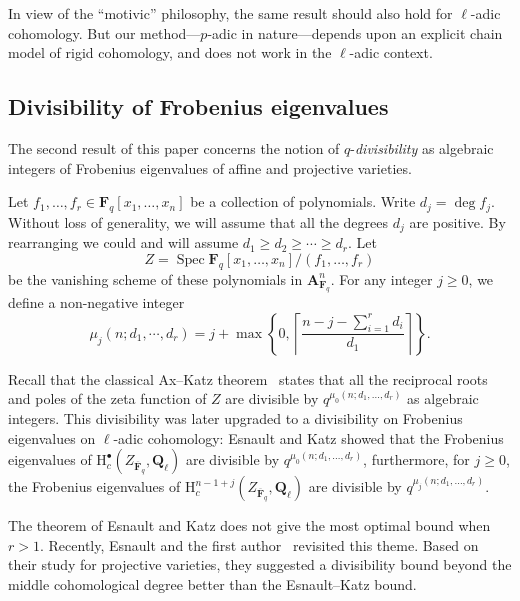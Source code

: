 \documentclass{amsart}
\numberwithin{equation}{section}
\theoremstyle{plain}
\theoremstyle{definition}
\renewcommand{\mathbb}{\mathbf}
\begin{document}
In view of the ``motivic'' philosophy, the same result should
also hold for \(\ell\)-adic cohomology. But our method---\(p\)-adic in
nature---depends upon an explicit chain model of rigid cohomology, and
does not work in the \(\ell\)-adic context.


\subsection{Divisibility of Frobenius eigenvalues}
The second result of this paper concerns the notion of
$q$-\emph{divisibility} as algebraic integers of Frobenius eigenvalues
of affine and projective varieties.

Let \(f_1,\ldots,f_r \in \mathbb{F}_{q}[x_1,\ldots,x_n]\) be a collection of
polynomials. Write \(d_j = \deg f_j\). Without loss of generality, we will assume that all the degrees $d_j$ are
positive. By rearranging we could and will assume
\(d_1\geq d_2\geq \cdots \geq d_r\).
Let \[Z = \operatorname{Spec}\mathbb{F}_q[x_1,\ldots,x_n]/(f_1,\ldots,f_r)\]
be the vanishing scheme of these polynomials in \(\mathbb{A}^{n}_{\mathbb{F}_q}\). For any integer $j\geq 0$,
we define a  non-negative integer
\begin{equation*}
  \mu_j(n;d_1,\cdots, d_r) = j + \max\left\{0, \left\lceil \frac{n-j-\sum_{i=1}^{r}d_i}{d_1}\right\rceil\right\}.
\end{equation*}

Recall that the classical Ax--Katz
theorem~\cite{ax:zeroes-of-polynomials-over-finite-fields,katz:on-a-theorem-of-ax} states that all the
reciprocal roots and poles of the zeta function of \(Z\) are divisible by
\(q^{\mu_0(n;d_1,\ldots,d_r)}\) as algebraic integers. This divisibility was
later upgraded to a divisibility on Frobenius eigenvalues on \(\ell\)-adic
cohomology: Esnault and Katz \cite{esnault-katz:cohomological-divisibility}
showed that the Frobenius eigenvalues of
\(\mathrm{H}^{\bullet}_{c}(Z_{\overline{\mathbb{F}}_q},\mathbb{Q}_{\ell})\)
are divisible by \(q^{\mu_{0}(n;d_1,\ldots,d_r)}\), furthermore,  for $j\geq 0$,
the Frobenius eigenvalues of \(\mathrm{H}^{n-1+j}_{c}(Z_{\overline{\mathbb{F}}_q},\mathbb{Q}_{\ell})\)
are divisible by \(q^{\mu_{j}(n;d_1,\ldots,d_r)}\).

The theorem of Esnault and Katz does not give the most optimal bound when \(r>1\).
Recently, Esnault and the first author~\cite{esnault-wan:divisibility} revisited
this theme. Based on their study for projective varieties, they suggested
a divisibility bound beyond the middle cohomological degree better than
the Esnault--Katz bound.
\end{document}
